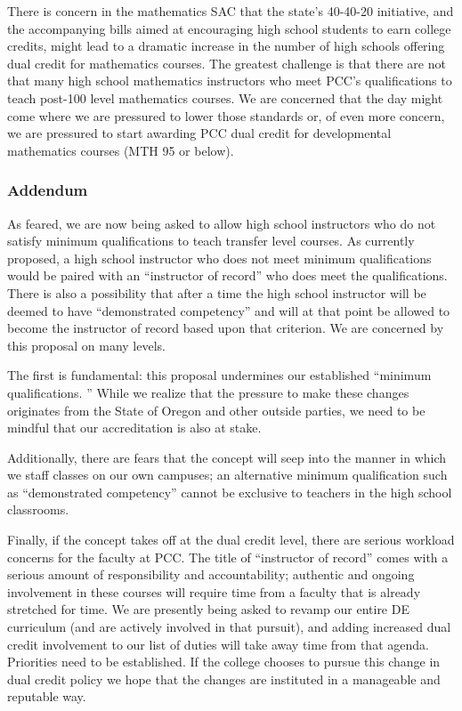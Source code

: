 There is concern in the mathematics SAC that the state's 40-40-20 initiative, and the accompanying bills aimed at encouraging high school students to earn college credits, might lead to a dramatic increase in the number of high schools offering dual credit for mathematics courses.
The greatest challenge is that there are not that many high school mathematics instructors who meet PCC's qualifications to teach post-100 level mathematics courses.
We are concerned that the day might come where we are pressured to lower those standards or, of even more concern, we are pressured to start awarding PCC dual credit for developmental mathematics courses (MTH 95 or below).

\subsubsection{Addendum}
As feared, we are now being asked to allow high school instructors who do not satisfy minimum qualifications to teach transfer level courses.
As currently proposed, a high school instructor who does not meet minimum qualifications would be paired with an ``instructor of record'' who does meet the qualifications.
There is also a possibility that after a time the high school instructor will be deemed to have ``demonstrated competency'' and will at that point be allowed to become the instructor of record based upon that criterion.
We are concerned by this proposal on many levels.

The first is fundamental: this proposal undermines our established ``minimum qualifications.
''
While we realize that the pressure to make these changes originates from the State of Oregon and other outside parties, we
need to be mindful that our accreditation is also at stake.

Additionally, there are fears that the concept will seep into the manner in which we staff classes on our own campuses; an alternative minimum qualification such as ``demonstrated competency'' cannot be exclusive to teachers in the high school classrooms.

Finally, if the concept takes off at the dual credit level, there are serious workload concerns for the faculty at PCC.
The title of ``instructor of record'' comes with a serious amount of responsibility and accountability; authentic and ongoing involvement in these courses will require time from a faculty that is already stretched for time.
We are presently being asked to revamp our entire DE curriculum (and are actively involved in that pursuit), and adding increased dual credit involvement to our list of duties will take away time from that agenda.
Priorities need to be established.
If the college chooses to pursue this change in dual credit policy we hope that the changes are instituted in a manageable and reputable way.

